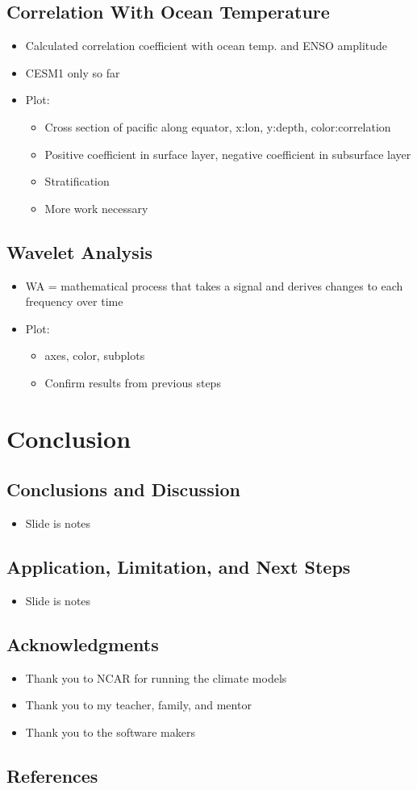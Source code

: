 \documentclass[little]{basic}
\begin{document}
\subsection*{Correlation With Ocean Temperature}
\label{sec:orgbdaf9d4}
\begin{itemize}
\item Calculated correlation coefficient with ocean temp. and ENSO amplitude
\item CESM1 only so far
\item Plot:
\begin{itemize}
\item Cross section of pacific along equator, x:lon, y:depth, color:correlation
\item Positive coefficient in surface layer, negative coefficient in subsurface layer
\item Stratification
\item More work necessary
\end{itemize}
\end{itemize}
\subsection*{Wavelet Analysis}
\label{sec:orga32dcde}
\begin{itemize}
\item WA = mathematical process that takes a signal and derives changes to each frequency over time
\item Plot:
\begin{itemize}
\item axes, color, subplots
\item Confirm results from previous steps
\end{itemize}
\end{itemize}
\section{Conclusion}
\label{sec:org46c3af5}
\subsection*{Conclusions and Discussion}
\label{sec:org10adbad}
\begin{itemize}
\item Slide is notes
\end{itemize}
\subsection*{Application, Limitation, and Next Steps}
\label{sec:org10fbd6a}
\begin{itemize}
\item Slide is notes
\end{itemize}
\subsection*{Acknowledgments}
\label{sec:orgf4b1b34}
\begin{itemize}
\item Thank you to NCAR for running the climate models
\item Thank you to my teacher, family, and mentor
\item Thank you to the software makers
\end{itemize}
\subsection*{References}
\label{sec:orgd9329c4}
\end{document}
